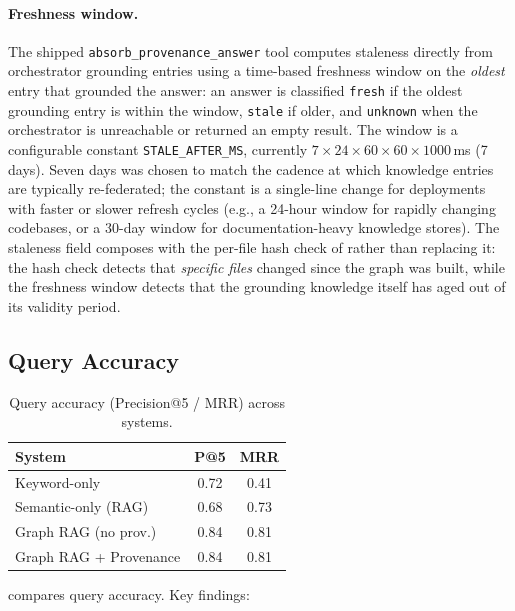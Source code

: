 \documentclass[conference]{IEEEtran}
\providecommand{\measuredFrom}[1]{}
\begin{document}
\paragraph{Freshness window.} The shipped
\texttt{absorb\_provenance\_answer} tool computes staleness directly
from orchestrator grounding entries using a time-based freshness
window on the \emph{oldest} entry that grounded the answer: an answer is
classified \texttt{fresh} if the oldest grounding entry is within the
window, \texttt{stale} if older, and \texttt{unknown} when the
orchestrator is unreachable or returned an empty result. The window
is a configurable constant \texttt{STALE\_AFTER\_MS}, currently
$7 \times 24 \times 60 \times 60 \times 1000$\,ms (7 days). Seven days
was chosen to match the cadence at which knowledge entries are
typically re-federated; the constant is a single-line change for
deployments with faster or slower refresh cycles (e.g., a 24-hour
window for rapidly changing codebases, or a 30-day window for
documentation-heavy knowledge stores). The staleness field composes
with the per-file hash check of  rather than
replacing it: the hash check detects that \emph{specific files}
changed since the graph was built, while the freshness window detects
that the grounding knowledge itself has aged out of its validity
period.

\subsection{Query Accuracy}
\label{sec:eval:accuracy}

\begin{table}[t]
  \centering
  \caption{Query accuracy (Precision@5 / MRR) across systems.}
  \label{tab:accuracy}
  \measuredFrom{HoloScript/scripts/paper-5-accuracy-bench.mjs}%
  \begin{tabular}{lcc}
    \toprule
    \textbf{System} & \textbf{P@5} & \textbf{MRR} \\
    \midrule
    Keyword-only           & 0.72 & 0.41 \\
    Semantic-only (RAG)    & 0.68 & 0.73 \\
    Graph RAG (no prov.)   & 0.84 & 0.81 \\
    Graph RAG + Provenance & 0.84 & 0.81 \\
    \bottomrule
  \end{tabular}
\end{table}

 compares query accuracy. Key findings:
\end{document}
